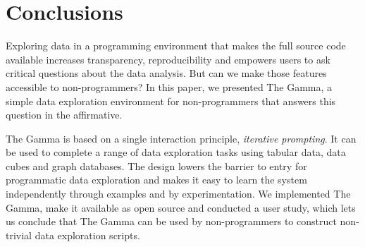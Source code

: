 \documentclass[manuscript,review,anonymous]{acmart}
\begin{document}
\section{Conclusions}
Exploring data in a programming environment that makes the full source code available increases
transparency, reproducibility and empowers users to ask critical questions about the data analysis.
But can we make those features accessible to non-programmers? In this paper, we presented The Gamma,
a simple data exploration environment for non-programmers that answers this question in the
affirmative.

The Gamma is based on a single interaction principle, \emph{iterative prompting}. It can be used to
complete a range of data exploration tasks using tabular data, data cubes and graph databases.
The design lowers the barrier to entry for programmatic data exploration and makes it easy to learn
the system independently through examples and by experimentation. We implemented The Gamma, make it
available as open source and conducted a user study, which lets us conclude that
The Gamma can be used by non-programmers to construct non-trivial data exploration scripts.



\end{document}
